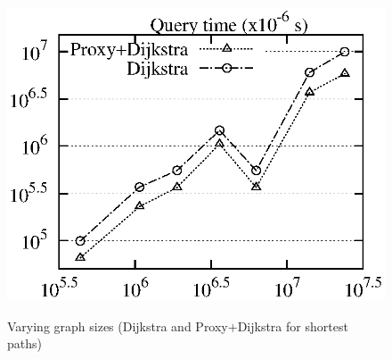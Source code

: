 \begin{figure}[tb!]
\begin{center}
{\includegraphics[scale=0.422]{./exp/query_q7_path_dj.eps}}
\end{center}
\vspace{-0.5ex}
\caption{Varying graph sizes (Dijkstra and Proxy+Dijkstra for shortest paths)}
\label{fig:performance_path_graph_size_dj}
\vspace{-1ex}
\end{figure}



